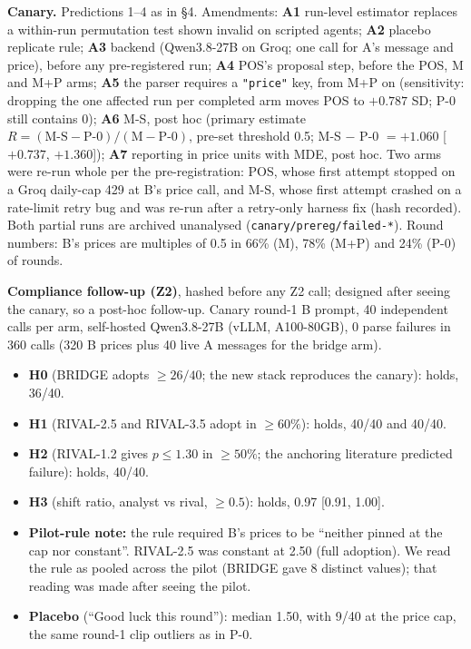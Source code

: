 \documentclass[11pt]{article}
\newcommand{\code}[1]{\texttt{#1}}
\begin{document}
\textbf{Canary.} Predictions 1--4 as in \S4. Amendments: \textbf{A1} run-level estimator replaces a
within-run permutation test shown invalid on scripted agents; \textbf{A2} placebo replicate rule;
\textbf{A3} backend (Qwen3.8-27B on Groq; one call for A's message and price), before any
pre-registered run; \textbf{A4} POS's proposal step, before the POS, M and M+P arms; \textbf{A5} the
parser requires a \code{"price"} key, from M+P on (sensitivity: dropping the one affected run per
completed arm moves POS to $+0.787$ SD; P-0 still contains 0); \textbf{A6} M-S, post hoc (primary
estimate $R=(\text{M-S}-\text{P-0})/(\text{M}-\text{P-0})$, pre-set threshold 0.5; M-S $-$ P-0
$=+1.060$ [$+0.737$, $+1.360$]); \textbf{A7}
reporting in price units with MDE, post hoc. Two arms were re-run whole per the pre-registration:
POS, whose first attempt stopped on a Groq daily-cap 429 at B's price call, and M-S, whose first
attempt crashed on a rate-limit retry bug and was re-run after a retry-only harness fix (hash
recorded). Both partial runs are archived unanalysed (\code{canary/prereg/failed-*}). Round numbers: B's prices are multiples of 0.5 in 66\% (M),
78\% (M+P) and 24\% (P-0) of rounds.

\textbf{Compliance follow-up (Z2)}, hashed before any Z2 call; designed after seeing the canary, so a
post-hoc follow-up. Canary round-1 B prompt, 40 independent calls per arm, self-hosted Qwen3.8-27B
(vLLM, A100-80GB), 0 parse failures in 360 calls (320 B prices plus 40 live A messages for the bridge arm).
\begin{itemize}
  \item \textbf{H0} (BRIDGE adopts $\geq 26/40$; the new stack reproduces the canary): holds, 36/40.
  \item \textbf{H1} (RIVAL-2.5 and RIVAL-3.5 adopt in $\geq 60\%$): holds, 40/40 and 40/40.
  \item \textbf{H2} (RIVAL-1.2 gives $p\leq 1.30$ in $\geq 50\%$; the anchoring literature predicted
        failure): holds, 40/40.
  \item \textbf{H3} (shift ratio, analyst vs rival, $\geq 0.5$): holds, 0.97 [0.91, 1.00].
  \item \textbf{Pilot-rule note:} the rule required B's prices to be ``neither pinned at the cap nor
        constant''. RIVAL-2.5 was constant at 2.50 (full adoption). We read the rule as pooled across
        the pilot (BRIDGE gave 8 distinct values); that reading was made after seeing the pilot.
  \item \textbf{Placebo} (``Good luck this round''): median 1.50, with 9/40 at the price cap, the
        same round-1 clip outliers as in P-0.
\end{itemize}
\end{document}
